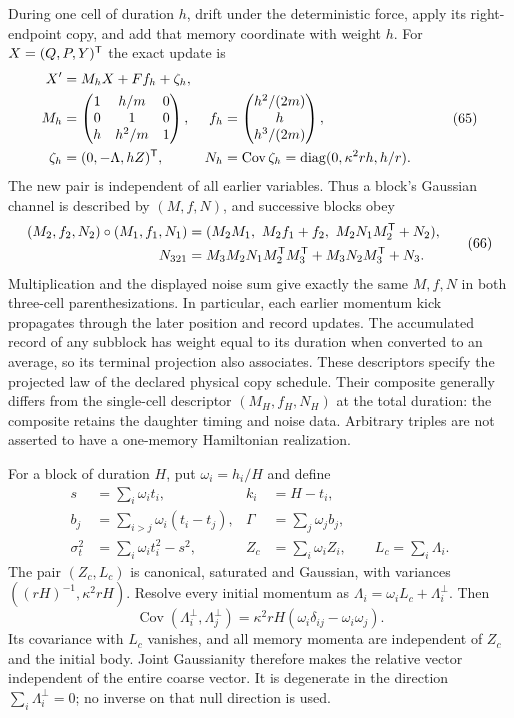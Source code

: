 \documentclass[11pt,a4paper]{article}
\begin{document}
During one cell of duration \(h\), drift under the deterministic force,
apply its right-endpoint copy, and add that memory coordinate with
weight \(h\). For \(X=(Q,P,Y)^{\sf T}\) the exact update is
\[\begin{aligned}
X'&=M_hX+Ff_h+\zeta_h,\\
M_h&=\begin{pmatrix}1&h/m&0\\0&1&0\\h&h^2/m&1\end{pmatrix},
&f_h&=\begin{pmatrix}h^2/(2m)\\h\\h^3/(2m)\end{pmatrix},\\
\zeta_h&=(0,-\Lambda,hZ)^{\sf T},
&N_h&=\operatorname{Cov}\zeta_h
       =\operatorname{diag}(0,\kappa^2rh,h/r).
\end{aligned}\tag{65}\] The new pair is independent of all earlier
variables. Thus a block's Gaussian channel is described by \((M,f,N)\),
and successive blocks obey \[\begin{aligned}
(M_2,f_2,N_2)\circ(M_1,f_1,N_1)
={}&(M_2M_1,\ M_2f_1+f_2,\ M_2N_1M_2^{\sf T}+N_2),\\
N_{321}={}&M_3M_2N_1M_2^{\sf T}M_3^{\sf T}
             +M_3N_2M_3^{\sf T}+N_3.
\end{aligned}\tag{66}\] Multiplication and the displayed noise sum give
exactly the same \(M,f,N\) in both three-cell parenthesizations. In
particular, each earlier momentum kick propagates through the later
position and record updates. The accumulated record of any subblock has
weight equal to its duration when converted to an average, so its
terminal projection also associates. These descriptors specify the
projected law of the declared physical copy schedule. Their composite
generally differs from the single-cell descriptor \((M_H,f_H,N_H)\) at
the total duration: the composite retains the daughter timing and noise
data. Arbitrary triples are not asserted to have a one-memory
Hamiltonian realization.

For a block of duration \(H\), put \(\omega_i=h_i/H\) and define
\[\begin{aligned}
s&=\sum_i\omega_it_i,& k_i&=H-t_i,\\
b_j&=\sum_{i>j}\omega_i(t_i-t_j),&
\Gamma&=\sum_j\omega_jb_j,\\
\sigma_t^2&=\sum_i\omega_it_i^2-s^2,&
Z_c&=\sum_i\omega_iZ_i,\qquad L_c=\sum_i\Lambda_i.
\end{aligned}\] The pair \((Z_c,L_c)\) is canonical, saturated and
Gaussian, with variances \(((rH)^{-1},\kappa^2rH)\). Resolve every
initial momentum as \(\Lambda_i=\omega_iL_c+\Lambda_i^\perp\). Then
\[\operatorname{Cov}(\Lambda_i^\perp,\Lambda_j^\perp)
=\kappa^2rH(\omega_i\delta_{ij}-\omega_i\omega_j).
\tag{67}\] Its covariance with \(L_c\) vanishes, and all memory momenta
are independent of \(Z_c\) and the initial body. Joint Gaussianity
therefore makes the relative vector independent of the entire coarse
vector. It is degenerate in the direction \(\sum_i\Lambda_i^\perp=0\);
no inverse on that null direction is used.
\end{document}

